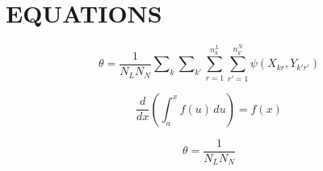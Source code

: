 \documentclass[
]{book}
\begin{document}
\hypertarget{myEquations}{%
\chapter{EQUATIONS}\label{myEquations}}

\begin{equation*} 
\theta =\frac{1}{N_LN_N}\sum\nolimits_k{\sum\nolimits_{k'}{\sum\limits_{r=1}^{n_{k}^{L}}{\sum\limits_{r'=1}^{n_{k'}^{N}}{\psi (X_{kr},{Y_{k'r'}})}}}}
\end{equation*}

\begin{equation*} 
\frac{d}{dx}\left( \int_{a}^{x} f(u)\,du\right)=f(x)
\end{equation*}

\begin{equation*} 
\theta =\frac{1}{N_L N_N}
\end{equation*}

  
\end{document}
